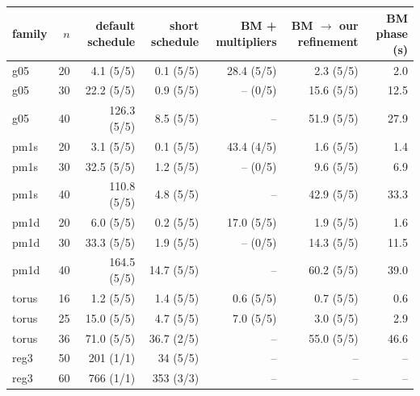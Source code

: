 \begin{tabular}{l r r r r r r}\toprule
family & $n$ & default schedule & short schedule & BM + multipliers & BM $\to$ our refinement & BM phase (s)\\\midrule
g05 & 20 & 4.1 (5/5) & 0.1 (5/5) & 28.4 (5/5) & 2.3 (5/5) & 2.0 \\
g05 & 30 & 22.2 (5/5) & 0.9 (5/5) & -- (0/5) & 15.6 (5/5) & 12.5 \\
g05 & 40 & 126.3 (5/5) & 8.5 (5/5) & -- & 51.9 (5/5) & 27.9 \\
pm1s & 20 & 3.1 (5/5) & 0.1 (5/5) & 43.4 (4/5) & 1.6 (5/5) & 1.4 \\
pm1s & 30 & 32.5 (5/5) & 1.2 (5/5) & -- (0/5) & 9.6 (5/5) & 6.9 \\
pm1s & 40 & 110.8 (5/5) & 4.8 (5/5) & -- & 42.9 (5/5) & 33.3 \\
pm1d & 20 & 6.0 (5/5) & 0.2 (5/5) & 17.0 (5/5) & 1.9 (5/5) & 1.6 \\
pm1d & 30 & 33.3 (5/5) & 1.9 (5/5) & -- (0/5) & 14.3 (5/5) & 11.5 \\
pm1d & 40 & 164.5 (5/5) & 14.7 (5/5) & -- & 60.2 (5/5) & 39.0 \\
torus & 16 & 1.2 (5/5) & 1.4 (5/5) & 0.6 (5/5) & 0.7 (5/5) & 0.6 \\
torus & 25 & 15.0 (5/5) & 4.7 (5/5) & 7.0 (5/5) & 3.0 (5/5) & 2.9 \\
torus & 36 & 71.0 (5/5) & 36.7 (2/5) & -- & 55.0 (5/5) & 46.6 \\
reg3 & 50 & 201 (1/1) & 34 (5/5) & -- & -- & -- \\
reg3 & 60 & 766 (1/1) & 353 (3/3) & -- & -- & -- \\
\bottomrule\end{tabular}
